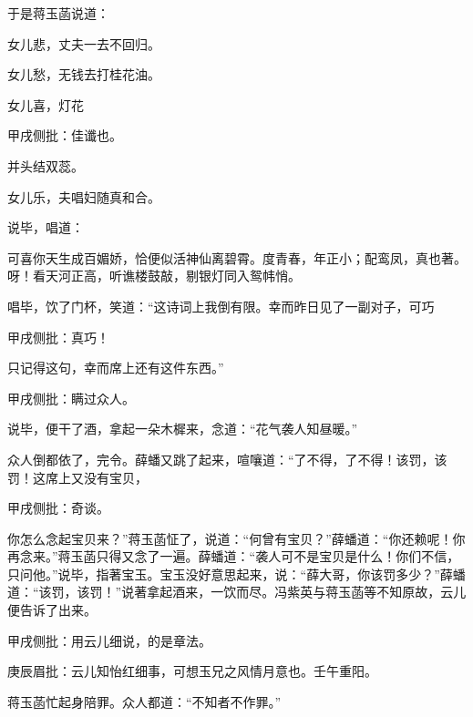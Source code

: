\begin{parag}
    于是蒋玉菡说道：
\end{parag}


\begin{poem}
    \begin{pl}
        女儿悲，丈夫一去不回归。
    \end{pl}

    \begin{pl}
        女儿愁，无钱去打桂花油。
    \end{pl}

    \begin{pl}女儿喜，灯花\end{pl}\begin{note}甲戌侧批：佳谶也。\end{note}\begin{pl}并头结双蕊。\end{pl}

    \begin{pl}

        女儿乐，夫唱妇随真和合。
    \end{pl}

\end{poem}


\begin{parag}
    说毕，唱道：
\end{parag}
\begin{poem}
    \begin{pl}
        可喜你天生成百媚娇，恰便似活神仙离碧霄。度青春，年正小；配鸾凤，真也著。呀！看天河正高，听谯楼鼓敲，剔银灯同入鸳帏悄。
    \end{pl}
\end{poem}


\begin{parag}
    唱毕，饮了门杯，笑道：“这诗词上我倒有限。幸而昨日见了一副对子，可巧\begin{note}甲戌侧批：真巧！\end{note}只记得这句，幸而席上还有这件东西。”\begin{note}甲戌侧批：瞒过众人。\end{note}说毕，便干了酒，拿起一朵木樨来，念道：“花气袭人知昼暖。”
\end{parag}


\begin{parag}
    众人倒都依了，完令。薛蟠又跳了起来，喧嚷道：“了不得，了不得！该罚，该罚！这席上又没有宝贝，\begin{note}甲戌侧批：奇谈。\end{note}你怎么念起宝贝来？”蒋玉菡怔了，说道：“何曾有宝贝？”薛蟠道：“你还赖呢！你再念来。”蒋玉菡只得又念了一遍。薛蟠道：“袭人可不是宝贝是什么！你们不信，只问他。”说毕，指著宝玉。宝玉没好意思起来，说：“薛大哥，你该罚多少？”薛蟠道：“该罚，该罚！”说著拿起酒来，一饮而尽。冯紫英与蒋玉菡等不知原故，云儿便告诉了出来。\begin{note}甲戌侧批：用云儿细说，的是章法。\end{note}\begin{note}庚辰眉批：云儿知怡红细事，可想玉兄之风情月意也。壬午重阳。\end{note}蒋玉菡忙起身陪罪。众人都道：“不知者不作罪。”
\end{parag}


